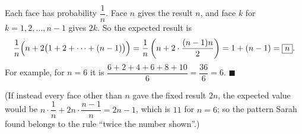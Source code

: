 Each face has probability $\dfrac1n$. Face $n$ gives the result $n$, and face $k$ for $k=1,2,\dots,n-1$ gives $2k$. So the expected result is
\[\dfrac1n\Bigl(n+2\bigl(1+2+\cdots+(n-1)\bigr)\Bigr)=\dfrac1n\left(n+2\cdot\dfrac{(n-1)n}{2}\right)=1+(n-1)=\boxed{n}.\]
For example, for $n=6$ it is $\dfrac{6+2+4+6+8+10}{6}=\dfrac{36}{6}=6$. $\blacksquare$

(If instead every face other than $n$ gave the fixed result $2n$, the expected value would be $n\cdot\dfrac1n+2n\cdot\dfrac{n-1}{n}=2n-1$, which is $11$ for $n=6$; so the pattern Sarah found belongs to the rule ``twice the number shown''.)
